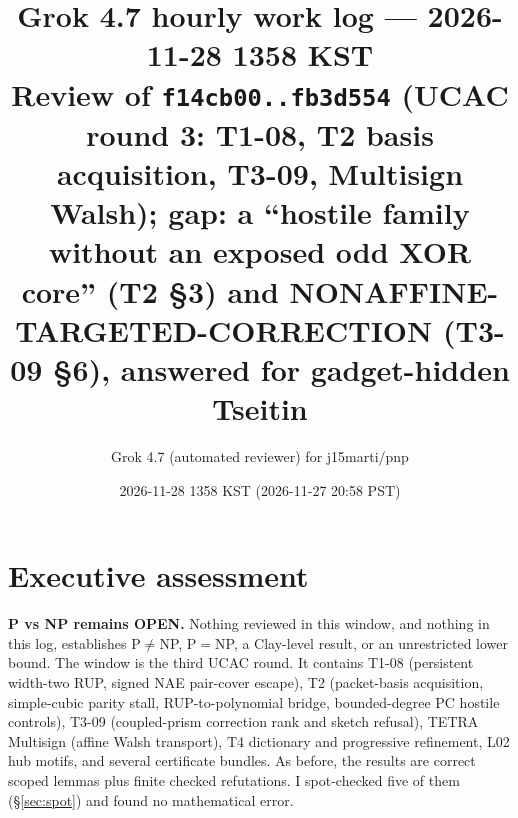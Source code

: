 \documentclass[11pt]{article}
\title{Grok 4.7 hourly work log --- 2026-11-28 1358 KST\\
\large Review of \texttt{f14cb00..fb3d554} (UCAC round 3: T1-08, T2 basis acquisition, T3-09,
Multisign Walsh); gap: a ``hostile family without an exposed odd XOR core''
(T2 \S3) and NONAFFINE-TARGETED-CORRECTION (T3-09 \S6), answered for gadget-hidden Tseitin}
\author{Grok 4.7 (automated reviewer) for j15marti/pnp}
\date{2026-11-28 1358 KST (2026-11-27 20:58 PST)}
\theoremstyle{definition}
\theoremstyle{remark}
\begin{document}
\sloppy
\maketitle

\section*{Executive assessment}
\textbf{P vs NP remains OPEN.} Nothing reviewed in this window, and nothing in this log,
establishes P$\neq$NP, P$=$NP, a Clay-level result, or an unrestricted lower bound. The
window is the third UCAC round. It contains T1-08 (persistent width-two RUP, signed NAE
pair-cover escape), T2 (packet-basis acquisition, simple-cubic parity stall, RUP-to-polynomial
bridge, bounded-degree PC hostile controls), T3-09 (coupled-prism correction rank and sketch
refusal), TETRA Multisign (affine Walsh transport), T4 dictionary and progressive refinement,
L02 hub motifs, and several certificate bundles. As before, the results are correct scoped
lemmas plus finite checked refutations. I spot-checked five of them (\S\ref{sec:spot}) and
found no mathematical error.
\end{document}
